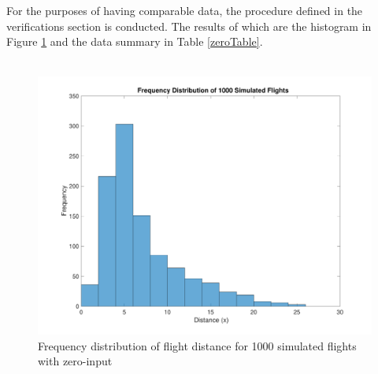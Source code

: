 \documentclass[12pt]{article}
\begin{document}
\\ \\
For the purposes of having comparable data, the procedure defined in the verifications section is conducted. The results of which are the histogram in Figure \ref{zeroHist} and the data summary in Table \ref{zeroTable}.
\\ \\
\begin{figure}[H]
\includegraphics[width=1\textwidth]{zeroHist.pdf}
\caption{Frequency distribution of flight distance for 1000 simulated flights with zero-input}
\label{zeroHist}
\end{figure}
\end{document}
